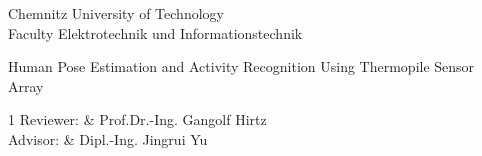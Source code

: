 %
%
\begin{tuctitlepage}
\begin{tuctitleorgunit}
Chemnitz University of Technology \\
Faculty Elektrotechnik und Informationstechnik\\
\end{tuctitleorgunit}

\tuctitlelogo

\bigskip
{}
\bigskip
{}

\vspace*{0pt plus 2fill}
\begin{tuctitletopic}
Human Pose Estimation and Activity Recognition Using Thermopile Sensor Array
\end{tuctitletopic}
\vspace*{0pt plus 2fill}

\begin{tuctitletable}[\bfseries]{1}
Reviewer: & Prof.Dr.-Ing. Gangolf Hirtz \\
Advisor:  & Dipl.-Ing. Jingrui Yu \\

\end{tuctitletable}

\vspace*{0pt plus 1fill}

\end{tuctitlepage}

